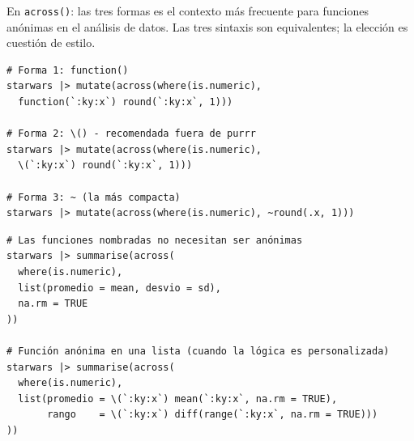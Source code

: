 \documentclass[8pt]{beamer}
\begin{document}
	\begin{frame}[fragile]{En \texttt{across()}: las tres formas}
		 es el contexto más frecuente para funciones anónimas en el análisis de datos. Las tres sintaxis son equivalentes; la elección es cuestión de estilo.

\begin{lstlisting}[style=RScript]
# Forma 1: function()
starwars |> mutate(across(where(is.numeric),
  function(`:ky:x`) round(`:ky:x`, 1)))

# Forma 2: \() - recomendada fuera de purrr
starwars |> mutate(across(where(is.numeric),
  \(`:ky:x`) round(`:ky:x`, 1)))

# Forma 3: ~ (la más compacta)
starwars |> mutate(across(where(is.numeric), ~round(.x, 1)))
\end{lstlisting}

\begin{lstlisting}[style=RScript]
# Las funciones nombradas no necesitan ser anónimas
starwars |> summarise(across(
  where(is.numeric),
  list(promedio = mean, desvio = sd),
  na.rm = TRUE
))

# Función anónima en una lista (cuando la lógica es personalizada)
starwars |> summarise(across(
  where(is.numeric),
  list(promedio = \(`:ky:x`) mean(`:ky:x`, na.rm = TRUE),
       rango    = \(`:ky:x`) diff(range(`:ky:x`, na.rm = TRUE)))
))
\end{lstlisting}
	\end{frame}
\end{document}
